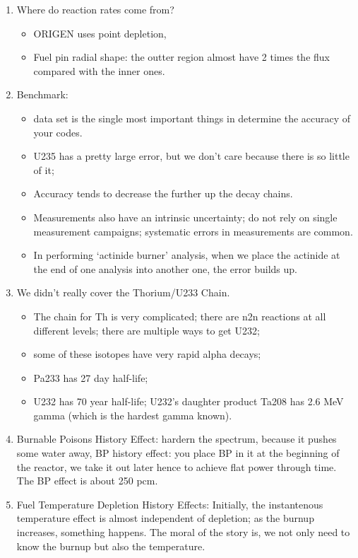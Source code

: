 \documentclass{school-22.211-notes}
\begin{document}
\clearpage
{}
\begin{enumerate}
\item Where do reaction rates come from? 
  \begin{itemize}
  \item ORIGEN uses point depletion, 
  \item Fuel pin radial shape: the outter region almost have 2 times the flux compared with the inner ones. 
  \end{itemize}
\item Benchmark: 
  \begin{itemize}
  \item data set is the single most important things in determine the accuracy of your codes.
  \item U235 has a pretty large error, but we don't care because there is so little of it;
  \item Accuracy tends to decrease the further up the decay chains. 
  \item Measurements also have an intrinsic uncertainty; do not rely on single measurement campaigns; systematic errors in measurements are common. 
  \item In performing `actinide burner' analysis, when we place the actinide at the end of one analysis into another one, the error builds up. 
  \end{itemize}
 \item We didn't really cover the Thorium/U233 Chain. 
   \begin{itemize}
   \item The chain for Th is very complicated; there are n2n reactions at all different levels; there are multiple ways to get U232; 
   \item some of these isotopes have very rapid alpha decays; 
   \item Pa233 has 27 day half-life; 
   \item U232 has 70 year half-life; U232's daughter product Ta208 has 2.6 MeV gamma (which is the hardest gamma known). 
   \end{itemize}
\item Burnable Poisons History Effect: hardern the spectrum, because it pushes some water away, BP history effect: you place BP in it at the beginning of the reactor, we take it out later hence to achieve flat power through time. The BP effect is about 250 pcm. 
\item Fuel Temperature Depletion History Effects: 
Initially, the instantenous temperature effect is almost independent of depletion; as the burnup increases, something happens. The moral of the story is, we not only need to know the burnup but also the temperature. 


\end{enumerate}
\end{document}
